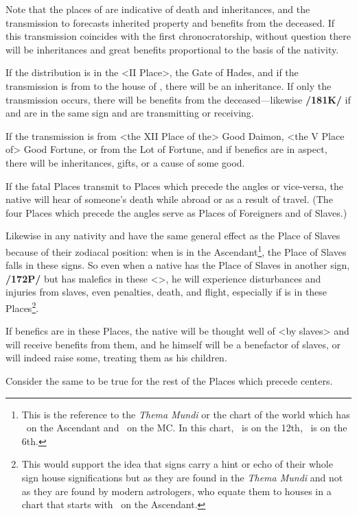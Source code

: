  
Note that the places of \Saturn\xspace are indicative of death and inheritances, and the transmission to \Jupiter\xspace forecasts inherited property and benefits from the deceased.
If this transmission coincides with the first chronocratorship, without question there will be inheritances and great benefits proportional to the basis of the nativity. 

If the distribution is in the <II Place>, the Gate of Hades, and if the transmission is from \Saturn\xspace to the house of \Jupiter, there will be an inheritance. If only
the transmission occurs, there will be benefits from the deceased—likewise \textbf{/181K/} if \Saturn\xspace and \Jupiter\xspace are in the same sign and are transmitting or receiving.

If the transmission is from <the XII Place of the> Good Daimon, <the V Place of> Good Fortune, or from the Lot of Fortune, and if benefics are in aspect, there will be inheritances, gifts, or a cause of some good. 

If the fatal Places transmit to Places which precede the angles or vice-versa, the native will hear of someone’s death while abroad or as a result of travel. (The four Places which precede the angles serve as Places of Foreigners and of Slaves.)

 Likewise in any nativity \Gemini\xspace and \Sagittarius\xspace have the same general effect as the Place of Slaves because of their zodiacal position: when \Cancer\xspace is in the Ascendant\footnote{This is the reference to the \textsl{Thema Mundi} or the chart of the world which has \Cancer\, on the Ascendant and \Aries\, on the MC. In this chart, \Gemini\, is on the 12th, \Sagittarius\, is on the 6th.}, the Place of Slaves falls in these signs. So even when a native has the Place of Slaves in another sign, \textbf{/172P/} but has malefics in these <\Gemini\xspace [or] \Sagittarius>, he will experience disturbances and injuries from slaves, even penalties, death, and flight, especially if \Saturn\xspace is in these Places\footnote{This would support the idea that signs carry a hint or echo of their whole sign house significations but as they are found in the \textsl{Thema Mundi} and not as they are found by modern astrologers, who equate them to houses in a chart that starts with \Aries\, on the Ascendant.}. 
 
 If benefics are in these Places, the native will be thought well of <by slaves> and will receive benefits from them, and he himself will be a benefactor of slaves, or will indeed raise some, treating them as his children.
 
Consider the same to be true for the rest of the Places which precede centers.

\newpage
